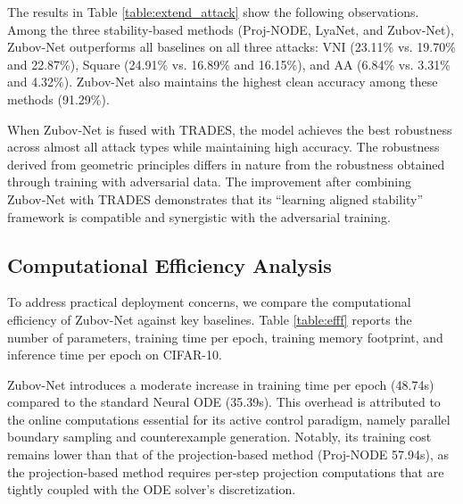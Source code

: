 \documentclass[journal]{IEEEtran}
\begin{document}
The results in Table \ref{table:extend_attack} show the following observations. Among the three stability-based methods (Proj-NODE, LyaNet, and Zubov-Net), Zubov-Net outperforms all baselines on all three attacks: VNI (23.11\% vs. 19.70\% and 22.87\%), Square (24.91\% vs. 16.89\% and 16.15\%), and AA (6.84\% vs. 3.31\% and 4.32\%). Zubov-Net also maintains the highest clean accuracy among these methods (91.29\%).

When Zubov‑Net is fused with TRADES, the model achieves the best robustness across almost all attack types while maintaining high accuracy. The robustness derived from geometric principles differs in nature from the robustness obtained through training with adversarial data. The improvement after combining Zubov‑Net with TRADES demonstrates that its “learning aligned stability” framework is compatible and synergistic with the adversarial training.


\subsection{Computational Efficiency Analysis}
To address practical deployment concerns, we compare the computational efficiency of Zubov-Net against key baselines. Table \ref{table:efff} reports the number of parameters, training time per epoch, training memory footprint, and inference time per epoch on CIFAR-10.


Zubov-Net introduces a moderate increase in training time per epoch (48.74s) compared to the standard Neural ODE (35.39s). This overhead is attributed to the online computations essential for its active control paradigm, namely parallel boundary sampling and counterexample generation. Notably, its training cost remains lower than that of the projection-based method (Proj-NODE 57.94s), as the projection-based method requires per-step projection computations that are tightly coupled with the ODE solver's discretization.
\end{document}
